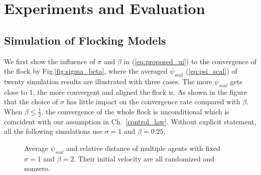 \chapter{Experiments and Evaluation}\label{experiment}

\section{Simulation of Flocking Models}

We first show the influence of $\sigma$ and $\beta$ in (\ref{eq:proposed_ui}) to the convergence of the flock by Fig.\ref{fig:sigma_beta}, where the averaged $\psi_{scal}$ (\ref{eq:psi_scal}) of twenty simulation results are illustrated with three cases. The more $\psi_{scal}$ gets close to 1, the more convergent and aligned the flock is. As shown in the figure that the choice of $\sigma$ has little impact on the convergence rate compared with $\beta$. When $\beta\leq\frac{1}{2}$, the convergence of the whole flock is unconditional which is coincident with our assumption in Ch.~\ref{control_law}. Without explicit statement, all the following simulations use $\sigma=1$ and $\beta=0.25$.

\begin{figure}[H]
  \centering
  \caption{Average $\psi_{scal}$ and relative distance of multiple agents with fixed $\sigma=1$ and $\beta=2$. Their initial velocity are all randomized and nonzero.}\label{fig:multiple_distance}
\end{figure}

